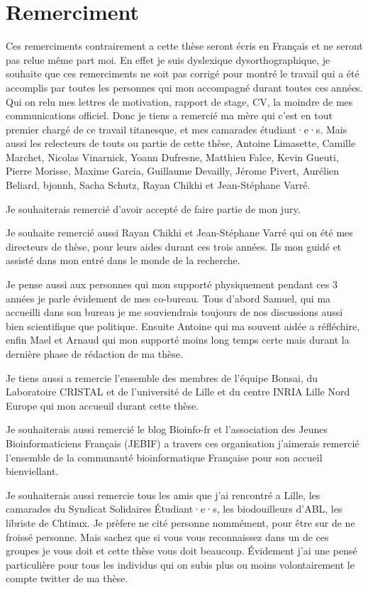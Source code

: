 \documentclass[main.tex]{subfiles}
\begin{document}
\section*{Remerciment}
%

Ces remerciments contrairement a cette thèse seront écris en Français et ne seront pas relue même part moi. En effet je suis dyslexique dysorthographique, je souhaite que ces remerciments ne soit pas corrigé pour montré le travail qui a été accomplis par toutes les personnes qui mon accompagné durant toutes ces années. Qui on relu mes lettres de motivation, rapport de stage, CV, la moindre de mes communications officiel. Donc je tiens a remercié ma mère qui c'est en tout premier chargé de ce travail titanesque, et mes camarades étudiant·e·s. Mais aussi les relecteurs de touts ou partie de cette thèse, Antoine Limasette, Camille Marchet, Nicolas Vinarnick, Yoann Dufresne, Matthieu Falce, Kevin Gueuti, Pierre Morisse, Maxime Garcia, Guillaume Devailly, Jérome Pivert, Aurélien Beliard, bjonnh, Sacha Schutz, Rayan Chikhi et Jean-Stéphane Varré.

Je souhaiterais remercié  d'avoir accepté de faire partie de mon jury.

Je souhaite remercié aussi Rayan Chikhi et Jean-Stéphane Varré qui on été mes directeurs de thèse, pour leurs aides durant ces trois années. Ils mon guidé et assisté dans mon entré dans le monde de la recherche.

Je pense aussi aux personnes qui mon supporté physiquement pendant ces 3 années je parle évidement de mes co-bureau. Tous d'abord Samuel, qui ma accueilli dans son bureau je me souviendrais toujours de nos discussions aussi bien scientifique que politique. Ensuite Antoine qui ma souvent aidée a réfléchire, enfin Mael et Arnaud qui mon supporté moins long temps certe mais durant la dernière phase de rédaction de ma thèse.

Je tiens aussi a remercie l'ensemble des membres de l'équipe Bonsai, du Laboratoire CRISTAL et de l'université de Lille et du centre INRIA Lille Nord Europe qui mon accueuil durant cette thèse.

Je souhaiterais aussi remercié le blog Bioinfo-fr et l'association des Jeunes Bioinformaticiens Français (JEBIF) a travers ces organisation j'aimerais remercié  l'ensemble de la communauté bioinformatique Française pour son accueil bienviellant.

Je souhaiterais aussi remercie tous les amis que j'ai rencontré a Lille, les camarades du Syndicat Solidaires Étudiant·e·s, les biodouilleurs d'ABL, les libriste de Chtinux. Je prèfere ne cité personne nommément, pour être sur de ne froissé personne. Mais sachez que si vous vous reconnaissez dans un de ces groupes je vous doit et cette thèse vous doit beaucoup. Évidement j'ai une pensé particulière pour tous les individus qui on subis plus ou moins volontairement le compte twitter de ma thèse. 
\end{document}
